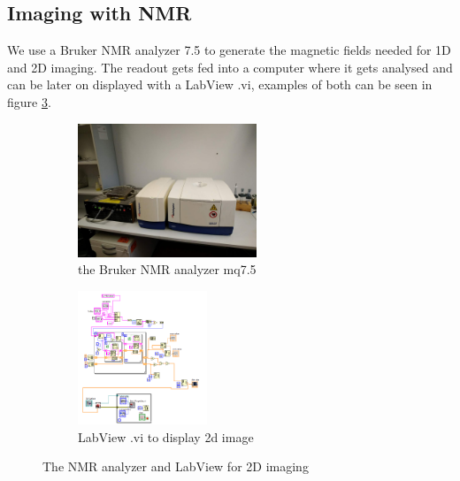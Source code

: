 \subsection{Imaging with NMR}\label{lay2}
We use a Bruker NMR analyzer 7.5 to generate the magnetic fields needed for 1D and 2D imaging. The readout gets fed into a computer where it gets analysed and can be later on displayed with a LabView .vi, examples of both can be seen in figure \ref{ImgLay}.
\begin{figure}[h!]
	\begin{subfigure}{0.5\textwidth}
	\includegraphics[width=0.9\linewidth ,height=4cm]{images/minispec_mq7_5.jpg}
	\caption{the Bruker NMR analyzer mq7.5}
	\label{Img1}
	\end{subfigure}
	\begin{subfigure}{0.5\textwidth}
	\includegraphics[width=0.9\linewidth ,height=4cm]{images/displaying_2d_image_labview_block.png}
	\caption{LabView .vi to display 2d image}
	\label{Img2}
	\end{subfigure}
	\caption{The NMR analyzer and LabView for 2D imaging}
	\label{ImgLay}
\end{figure}\\